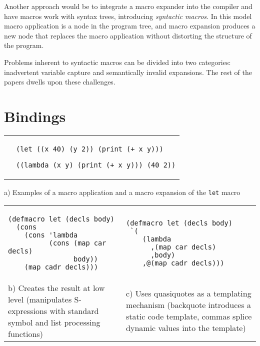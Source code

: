\documentclass[10pt,journal,a4paper]{IEEEtran}
\begin{document}
Another approach would be to integrate a macro expander into the compiler and
have macros work with syntax trees, introducing \emph{syntactic macros}.
In this model macro application is a node in the program tree,
and macro expansion produces a new node that replaces the macro application
without distorting the structure of the program.

Problems inherent to syntactic macros can be divided into two categories:
inadvertent variable capture and semantically invalid expansions.
The rest of the papers dwells upon these challenges.

\section{Bindings}

\begin{figure*}
\begin{listing}
\normalsize

\begin{tabular}{p{4.0cm} p{15cm}}\\
 &
\begin{verbatim}
(let ((x 40) (y 2)) (print (+ x y)))

((lambda (x y) (print (+ x y))) (40 2))
\end{verbatim}
\end{tabular}

\begin{center}
a) Examples of a macro application and a macro expansion of the \texttt{let} macro
\end{center}

\begin{tabular}{p{8.5cm} p{8.5cm}}\\
\begin{verbatim}
(defmacro let (decls body)
  (cons
    (cons 'lambda
          (cons (map car decls)
                body))
    (map cadr decls)))
\end{verbatim}
&
\begin{verbatim}
(defmacro let (decls body)
 `(
    (lambda
      ,(map car decls)
      ,body)
    ,@(map cadr decls)))
\end{verbatim}\\
b) Creates the result at low level (manipulates S-expressions
with standard symbol and list processing functions)
&
c) Uses quasiquotes \cite{bawden99} as a templating mechanism
(backquote introduces a static code template, commas splice dynamic values
into the template)
\end{tabular}


\end{listing}
\end{figure*}
\end{document}
